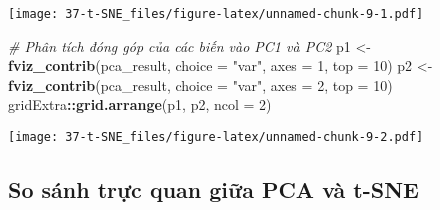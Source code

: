 \documentclass[
]{article}
\newenvironment{Shaded}{\begin{snugshade}}{\end{snugshade}}
\newcommand{\AttributeTok}[1]{\textcolor[rgb]{0.13,0.29,0.53}{#1}}
\newcommand{\CommentTok}[1]{\textcolor[rgb]{0.56,0.35,0.01}{\textit{#1}}}
\newcommand{\DecValTok}[1]{\textcolor[rgb]{0.00,0.00,0.81}{#1}}
\newcommand{\FunctionTok}[1]{\textcolor[rgb]{0.13,0.29,0.53}{\textbf{#1}}}
\newcommand{\NormalTok}[1]{#1}
\newcommand{\OtherTok}[1]{\textcolor[rgb]{0.56,0.35,0.01}{#1}}
\newcommand{\SpecialCharTok}[1]{\textcolor[rgb]{0.81,0.36,0.00}{\textbf{#1}}}
\newcommand{\StringTok}[1]{\textcolor[rgb]{0.31,0.60,0.02}{#1}}
\begin{document}
\texttt{[image: 37-t-SNE\_files/figure-latex/unnamed-chunk-9-1.pdf]}

\begin{Shaded}
\begin{Highlighting}[]
\CommentTok{\# Phân tích đóng góp của các biến vào PC1 và PC2}
\NormalTok{p1 }\OtherTok{\textless{}{-}} \FunctionTok{fviz\_contrib}\NormalTok{(pca\_result, }\AttributeTok{choice =} \StringTok{"var"}\NormalTok{, }\AttributeTok{axes =} \DecValTok{1}\NormalTok{, }\AttributeTok{top =} \DecValTok{10}\NormalTok{)}
\NormalTok{p2 }\OtherTok{\textless{}{-}} \FunctionTok{fviz\_contrib}\NormalTok{(pca\_result, }\AttributeTok{choice =} \StringTok{"var"}\NormalTok{, }\AttributeTok{axes =} \DecValTok{2}\NormalTok{, }\AttributeTok{top =} \DecValTok{10}\NormalTok{)}
\NormalTok{gridExtra}\SpecialCharTok{::}\FunctionTok{grid.arrange}\NormalTok{(p1, p2, }\AttributeTok{ncol =} \DecValTok{2}\NormalTok{)}
\end{Highlighting}
\end{Shaded}

\texttt{[image: 37-t-SNE\_files/figure-latex/unnamed-chunk-9-2.pdf]}

\subsection{So sánh trực quan giữa PCA và
t-SNE}\label{so-suxe1nh-trux1ef1c-quan-giux1eefa-pca-vuxe0-t-sne}
\end{document}
